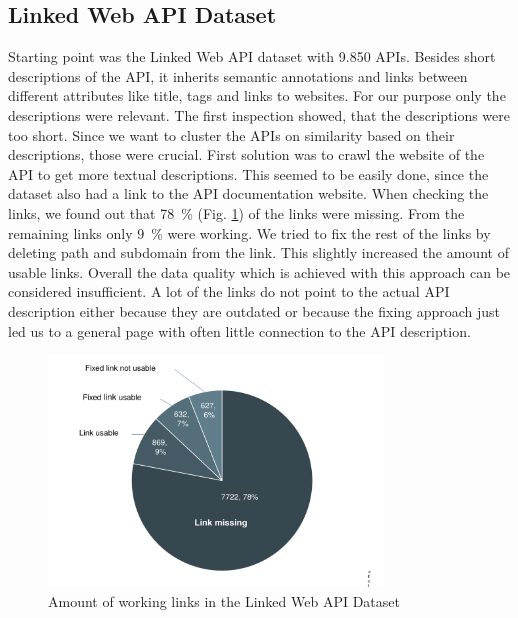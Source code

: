 \documentclass[a4paper]{IEEEtran}
\begin{document}
\subsection{Linked Web API Dataset}
Starting point was the Linked Web API dataset \cite{dojchinovskilinked} with 9.850 APIs. Besides short descriptions of the API, it inherits semantic annotations and links between different attributes like title, tags and links to websites. For our purpose only the descriptions were relevant. The first inspection showed, that the descriptions were too short. Since we want to cluster the APIs on similarity based on their descriptions, those were crucial. First solution was to crawl the website of the API to get more textual descriptions. This seemed to be easily done, since the dataset also had a link to the API documentation website. When checking the links, we found out that 78~\% (Fig. \ref{fig_sim2}) of the links were missing. From the remaining links only 9~\% were working. We tried to fix the rest of the links by deleting path and subdomain from the link. This slightly increased the amount of usable links. Overall the data quality which is achieved with this approach can be considered insufficient. A lot of the links do not point to the actual API description either because they are outdated or because the fixing approach just led us to a general page with often little connection to the API description.
\begin{figure}[h]
\centering
\includegraphics[width= 3.5in]{img/graph2.pdf}
\caption{Amount of working links in the Linked Web API Dataset}
\label{fig_sim2}
\end{figure}
\end{document}
